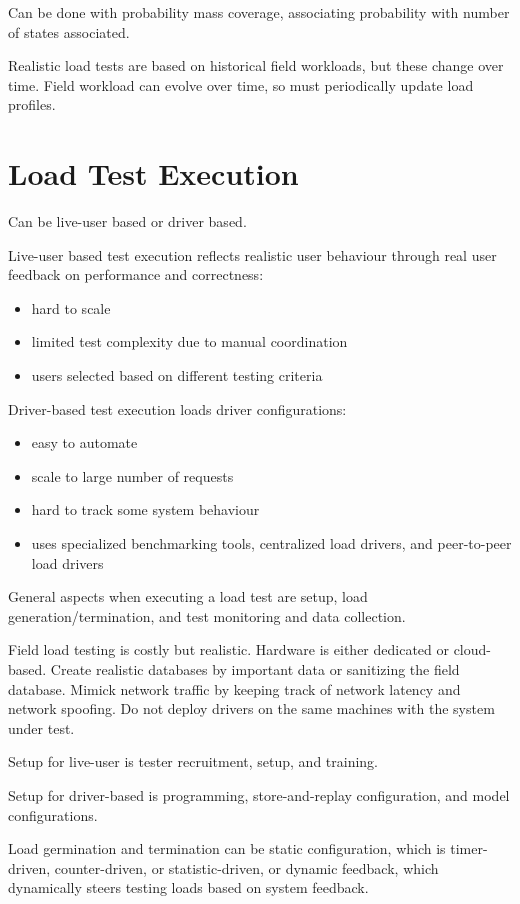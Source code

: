 \documentclass[11pt]{article}
\begin{document}
Can be done with probability mass coverage, associating probability with number of states associated.

Realistic load tests are based on historical field workloads, but these change over time.
Field workload can evolve over time, so must periodically update load profiles.
\section{Load Test Execution}
\label{sec:org6147ac3}
Can be live-user based or driver based.

Live-user based test execution reflects realistic user behaviour through real user feedback on
performance and correctness:
\begin{itemize}
\item hard to scale
\item limited test complexity due to manual coordination
\item users selected based on different testing criteria
\end{itemize}

Driver-based test execution loads driver configurations:
\begin{itemize}
\item easy to automate
\item scale to large number of requests
\item hard to track some system behaviour
\item uses specialized benchmarking tools, centralized load drivers, and peer-to-peer load drivers
\end{itemize}

General aspects when executing a load test are setup, load generation/termination, and test
monitoring and data collection.

Field load testing is costly but realistic.
Hardware is either dedicated or cloud-based.
Create realistic databases by important data or sanitizing the field database.
Mimick network traffic by keeping track of network latency and network spoofing.
Do not deploy drivers on the same machines with the system under test.

Setup for live-user is tester recruitment, setup, and training.

Setup for driver-based is programming, store-and-replay configuration, and model configurations.

Load germination and termination can be static configuration, which is timer-driven, counter-driven,
or statistic-driven, or dynamic feedback, which dynamically steers testing loads based on system feedback.
\end{document}
